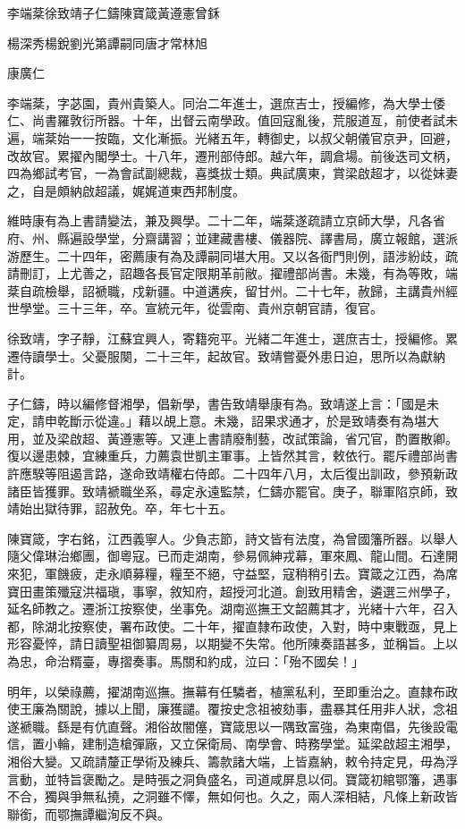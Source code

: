 
\begin{pinyinscope}
李端棻徐致靖子仁鑄陳寶箴黃遵憲曾鉌

楊深秀楊銳劉光第譚嗣同唐才常林旭

康廣仁

李端棻，字苾園，貴州貴築人。同治二年進士，選庶吉士，授編修，為大學士倭仁、尚書羅敦衍所器。十年，出督云南學政。值回寇亂後，荒服道亙，前使者試未遍，端棻始一一按臨，文化漸振。光緒五年，轉御史，以叔父朝儀官京尹，回避，改故官。累擢內閣學士。十八年，遷刑部侍郎。越六年，調倉場。前後迭司文柄，四為鄉試考官，一為會試副總裁，喜獎拔士類。典試廣東，賞梁啟超才，以從妹妻之，自是頗納啟超議，娓娓道東西邦制度。

維時康有為上書請變法，兼及興學。二十二年，端棻遂疏請立京師大學，凡各省府、州、縣遍設學堂，分齋講習；並建藏書樓、儀器院、譯書局，廣立報館，選派游歷生。二十四年，密薦康有為及譚嗣同堪大用。又以各衙門則例，語涉紛歧，疏請刪訂，上尤善之，詔趣各長官定限期革前敝。擢禮部尚書。未幾，有為等敗，端棻自疏檢舉，詔褫職，戍新疆。中道遘疾，留甘州。二十七年，赦歸，主講貴州經世學堂。三十三年，卒。宣統元年，從雲南、貴州京朝官請，復官。

徐致靖，字子靜，江蘇宜興人，寄籍宛平。光緒二年進士，選庶吉士，授編修。累遷侍讀學士。父憂服闋，二十三年，起故官。致靖嘗憂外患日迫，思所以為獻納計。

子仁鑄，時以編修督湘學，倡新學，書告致靖舉康有為。致靖遂上言：「國是未定，請申乾斷示從違。」藉以覘上意。未幾，詔果求通才，於是致靖奏有為堪大用，並及梁啟超、黃遵憲等。又連上書請廢制藝，改試策論，省冗官，酌置散卿。復以邊患棘，宜練重兵，力薦袁世凱主軍事。上皆然其言，敕依行。罷斥禮部尚書許應騤等阻遏言路，遂命致靖權右侍郎。二十四年八月，太后復出訓政，參預新政諸臣皆獲罪。致靖褫職坐系，尋定永遠監禁，仁鑄亦罷官。庚子，聯軍陷京師，致靖始出獄待罪，詔赦免。卒，年七十五。

陳寶箴，字右銘，江西義寧人。少負志節，詩文皆有法度，為曾國籓所器。以舉人隨父偉琳治鄉團，御粵寇。已而走湖南，參易佩紳戎幕，軍來鳳、龍山間。石達開來犯，軍饑疲，走永順募糧，糧至不絕，守益堅，寇稍稍引去。寶箴之江西，為席寶田畫策殲寇洪福瑱，事寧，敘知府，超授河北道。創致用精舍，遴選三州學子，延名師教之。遷浙江按察使，坐事免。湖南巡撫王文韶薦其才，光緒十六年，召入都，除湖北按察使，署布政使。二十年，擢直隸布政使，入對，時中東戰亟，見上形容憂悴，請日讀聖祖御纂周易，以期變不失常。他所陳奏語甚多，並稱旨。上以為忠，命治糈臺，專摺奏事。馬關和約成，泣曰：「殆不國矣！」

明年，以榮祿薦，擢湖南巡撫。撫幕有任驎者，植黨私利，至即重治之。直隸布政使王廉為關說，據以上聞，廉獲譴。覆按史念祖被劾事，盡暴其任用非人狀，念祖遂褫職。繇是有伉直聲。湘俗故闇僿，寶箴思以一隅致富強，為東南倡，先後設電信，置小輪，建制造槍彈廠，又立保衛局、南學會、時務學堂。延梁啟超主湘學，湘俗大變。又疏請釐正學術及練兵、籌款諸大端，上皆嘉納，敕令持定見，毋為浮言動，並特旨褒勵之。是時張之洞負盛名，司道咸屏息以伺。寶箴初綰鄂籓，遇事不合，獨與爭無私撓，之洞雖不懌，無如何也。久之，兩人深相結，凡條上新政皆聯銜，而鄂撫譚繼洵反不與。


\end{pinyinscope}
